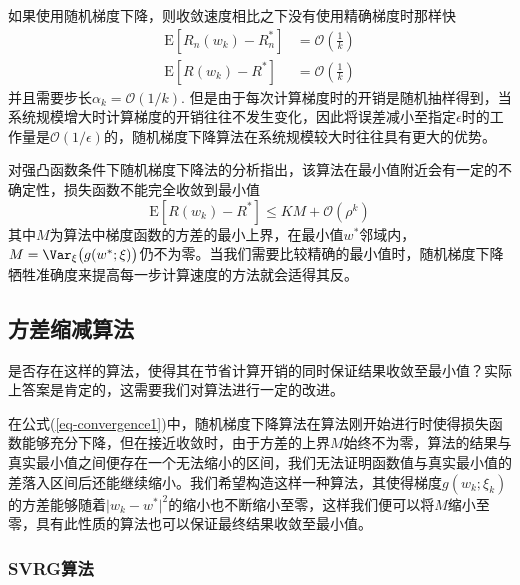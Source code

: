 如果使用随机梯度下降，则收敛速度相比之下没有使用精确梯度时那样快
\begin{align}\label{key}
\mathrm{E}[R_n(w_k)-R_n^*]&=\mathcal{O}(\frac1k)\\
\mathrm{E}[R(w_k)-R^*]&=\mathcal{O}(\frac1k)
\end{align}
并且需要步长$\alpha_k=\mathcal{O}(1/k)$. 但是由于每次计算梯度时的开销是随机抽样得到，当系统规模增大时计算梯度的开销往往不发生变化，因此将误差减小至指定$\epsilon$时的工作量是$\mathcal{O}(1/\epsilon)$的，随机梯度下降算法在系统规模较大时往往具有更大的优势。

对强凸函数条件下随机梯度下降法的分析\cite[27]{bottouOptimizationMethodsLargeScale2018}指出，该算法在最小值附近会有一定的不确定性，损失函数不能完全收敛到最小值
\begin{equation}\label{eq-convergence1}
\mathrm{E}\left[R(w_{k})-R^*\right]\leq KM+\mathcal{O}(\rho^k)
\end{equation}
其中$M$为算法中梯度函数的方差的最小上界，在最小值$w^*$邻域内，$M=\Var_\xi\big(g(w^*;\xi)\big)$仍不为零。当我们需要比较精确的最小值时，随机梯度下降牺牲准确度来提高每一步计算速度的方法就会适得其反。

\subsection{方差缩减算法}

是否存在这样的算法，使得其在节省计算开销的同时保证结果收敛至最小值？实际上答案是肯定的，这需要我们对算法进行一定的改进。

在公式(\ref{eq-convergence1})中，随机梯度下降算法在算法刚开始进行时使得损失函数能够充分下降，但在接近收敛时，由于方差的上界$M$始终不为零，算法的结果与真实最小值之间便存在一个无法缩小的区间，我们无法证明函数值与真实最小值的差落入区间后还能继续缩小。我们希望构造这样一种算法，其使得梯度$g(w_k;\xi_k)$的方差能够随着$\lvert w_k-w^*\rvert^2$的缩小也不断缩小至零，这样我们便可以将$M$缩小至零，具有此性质的算法也可以保证最终结果收敛至最小值。

\subsubsection{SVRG算法}

